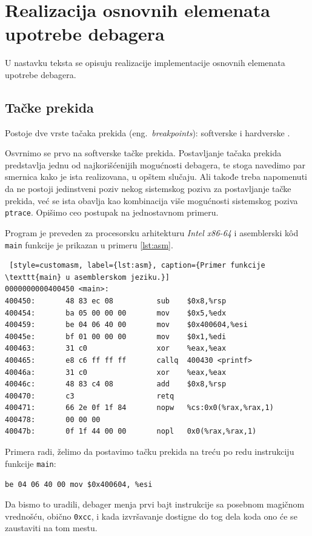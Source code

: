 \documentclass[12pt,oneside]{memoir}
\begin{document}
\section{Realizacija osnovnih elemenata upotrebe debagera}

U nastavku teksta se opisuju realizacije implementacije osnovnih elemenata upotrebe debagera.

\subsection{Tačke prekida}

Postoje dve vrste tačaka prekida (eng.~\emph{breakpoints}): softverske i hardverske \cite{GDB}.

Osvrnimo se prvo na softverske tačke prekida. Postavljanje tačaka prekida predstavlja jednu od najkorišćenijih mogućnosti debagera, te stoga navedimo par smernica kako je ista realizovana, u opštem slučaju. Ali takođe treba napomenuti da ne postoji jedinstveni poziv nekog sistemskog poziva za postavljanje tačke prekida, već se ista obavlja kao kombinacija više mogućnosti  sistemskog poziva \texttt{ptrace}. Opišimo ceo postupak na jednostavnom primeru.

Program je preveden za procesorsku arhitekturu \emph{Intel x86-64} i asemblerski k\^{o}d \texttt{main} funkcije je prikazan u primeru \ref{lst:asm}.
\begin{lstlisting} [style=customasm, label={lst:asm}, caption={Primer funkcije \texttt{main} u asemblerskom jeziku.}]
0000000000400450 <main>:
400450:       48 83 ec 08          sub    $0x8,%rsp
400454:       ba 05 00 00 00       mov    $0x5,%edx
400459:       be 04 06 40 00       mov    $0x400604,%esi
40045e:       bf 01 00 00 00       mov    $0x1,%edi
400463:       31 c0                xor    %eax,%eax
400465:       e8 c6 ff ff ff       callq  400430 <printf>
40046a:       31 c0                xor    %eax,%eax
40046c:       48 83 c4 08          add    $0x8,%rsp
400470:       c3                   retq   
400471:       66 2e 0f 1f 84       nopw   %cs:0x0(%rax,%rax,1)
400478:       00 00 00 
40047b:       0f 1f 44 00 00       nopl   0x0(%rax,%rax,1)

\end{lstlisting}


Primera radi, želimo da postavimo tačku prekida na treću po redu instrukciju funkcije \texttt{main}:

\texttt{be 04 06 40 00  mov \$0x400604, \%esi}

Da bismo to uradili, debager menja prvi bajt instrukcije sa posebnom magičnom vrednošću, obično \texttt{0xcc}, i kada izvršavanje dostigne do tog dela koda ono će se zaustaviti na tom mestu.
\end{document}

